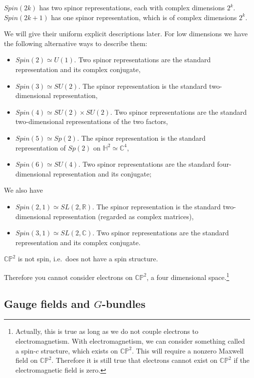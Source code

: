 \documentclass[12pt]{article}
\numberwithin{equation}{section}
\numberwithin{figure}{section}
\theoremstyle{remark}
\def\bC{\mathbb{C}}
\def\bH{\mathbb{H}}
\def\bR{\mathbb{R}}
\def\CP{\mathbb{CP}}
\def\Spin{\mathit{Spin}}
\begin{document}
\begin{fact}
$Spin(2k)$ has two spinor representations, each with complex dimensions $2^k$.\\
$Spin(2k+1)$ has one spinor representation, which is of complex dimensions $2^k$.
\end{fact}
We will give their uniform explicit descriptions later.
For low dimensions we have the following alternative ways to describe them:
  \begin{itemize}
    \item $\Spin(2)\simeq U(1)$. Two spinor representations are the standard representation and its complex conjugate,
    \item $\Spin(3)\simeq SU(2)$. The spinor representation is the standard two-dimensional representation,
    \item $\Spin(4)\simeq SU(2)\times SU(2)$. Two spinor representations are the standard two-dimensional representations of the two factors,
    \item $\Spin(5)\simeq Sp(2)$. The spinor representation is the standard  representation of $Sp(2)$ on $\bH^2 \simeq \bC^4$,
    \item $\Spin(6)\simeq SU(4)$. Two spinor representations are the standard four-dimensional representation and its conjugate;
  \end{itemize}
We also have
  \begin{itemize}
    \item $\Spin(2,1)\simeq SL(2,\bR)$. The spinor representation is the standard two-dimensional representation (regarded as complex matrices),
    \item $\Spin(3,1)\simeq SL(2,\bC)$. Two spinor representations are the standard representation and its complex conjugate.
  \end{itemize}

\begin{fact}
$\CP^2$ is not spin, i.e.~does not have a spin structure.
\end{fact}
Therefore you cannot consider electrons on $\CP^2$, a four dimensional space.\footnote{%
Actually, this is true as long as we do not couple electrons to electromagnetism.
With electromagnetism, we can consider something called a spin-$c$ structure,
which exists on $\CP^2$. This will require a nonzero Maxwell field on $\CP^2$.
Therefore it is still true that electrons cannot exist on $\CP^2$
if the electromagnetic field is zero.
}

\subsection{Gauge fields and $G$-bundles}
\end{document}

